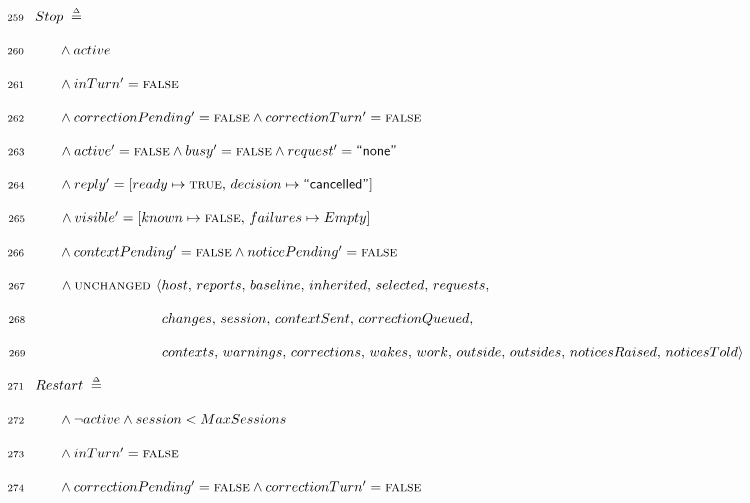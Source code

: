 \documentclass{article}
\makeatletter
\newcommand{\defeq}{\;\mathrel{\smash   %
    {{\stackrel{\scriptscriptstyle\Delta}{=}}}}\;}
\newcommand{\FALSE}{\textsc{false}}
\newcommand{\TRUE}{\textsc{true}}
\newcommand{\UNCHANGED}{\textsc{unchanged }}
\renewcommand{\_}{\rule{.4em}{.06em}\hspace{.05em}}
\newif\ifpcalshading \pcalshadingfalse
\newlength{\pcalvspace}\setlength{\pcalvspace}{0pt}%
\newcommand{\@pvspace}[1]{%
  \ifpcalshading
     \par\global\setlength{\pcalvspace}{#1}%
  \else
     \par\vspace{#1}%
  \fi
}
\renewcommand{\.}[1]{\ensuremath{\mbox{}#1\mbox{}}}
\newcommand{\@s}[1]{\hspace{#1pt}}
\newlength{\@xlen}
\newcommand\xtstrut%
  {\setlength{\@xlen}{1.05em}%
   \addtolength{\@xlen}{\pcalvspace}%
    \raisebox{\vshadelen}{\raisebox{-.25em}{\rule{0pt}{\@xlen}}}%
   \global\setlength{\vshadelen}{0pt}%
   \global\setlength{\pcalvspace}{0pt}}
\newcommand{\@x}[1]{\par
  \ifpcalshading
  \makebox[0pt][l]{\shadebox{\xtstrut\hspace*{\textwidth}}}%
  \fi
  \mbox{$\mbox{}#1\mbox{}$}}
\newcommand{\@w}[1]{\textsf{``{#1}''}}
\def\graymargin{1}
\newlength{\templena}
\newlength{\templenb}
\newcommand{\shadebox}[1]{{\setlength{\fboxsep}{\graymargin pt}%
     \savebox{\tempboxa}{#1}%
     \settoheight{\templena}{\usebox{\tempboxa}}%
     \settodepth{\templenb}{\usebox{\tempboxa}}%
     \hspace*{-\fboxsep}\raisebox{0pt}[\templena][\templenb]%
        {\colorbox{boxshade}{\usebox{\tempboxa}}}\hspace*{-\fboxsep}}}
\newlength{\vshadelen}
\makeatother
\begin{document}
\@x{\makebox[0pt][r]{\scriptsize 259\hspace{1em}} Stop \.{\defeq}}%
\@x{\makebox[0pt][r]{\scriptsize 260\hspace{1em}}\@s{16.4} \.{\land} active}%
 \@x{\makebox[0pt][r]{\scriptsize 261\hspace{1em}}\@s{16.4} \.{\land} inTurn
 \.{'} \.{=} {\FALSE}}%
 \@x{\makebox[0pt][r]{\scriptsize 262\hspace{1em}}\@s{16.4} \.{\land}
 correctionPending \.{'} \.{=} {\FALSE} \.{\land} correctionTurn \.{'} \.{=}
 {\FALSE}}%
 \@x{\makebox[0pt][r]{\scriptsize 263\hspace{1em}}\@s{16.4} \.{\land} active
 \.{'} \.{=} {\FALSE} \.{\land} busy \.{'} \.{=} {\FALSE} \.{\land} request
 \.{'} \.{=}\@w{none}}%
 \@x{\makebox[0pt][r]{\scriptsize 264\hspace{1em}}\@s{16.4} \.{\land} reply
 \.{'} \.{=} [ ready \.{\mapsto} {\TRUE} ,\, decision
 \.{\mapsto}\@w{cancelled} ]}%
 \@x{\makebox[0pt][r]{\scriptsize 265\hspace{1em}}\@s{16.4} \.{\land} visible
 \.{'} \.{=} [ known \.{\mapsto} {\FALSE} ,\, failures \.{\mapsto} Empty ]}%
 \@x{\makebox[0pt][r]{\scriptsize 266\hspace{1em}}\@s{16.4} \.{\land}
 contextPending \.{'} \.{=} {\FALSE} \.{\land} noticePending \.{'} \.{=}
 {\FALSE}}%
 \@x{\makebox[0pt][r]{\scriptsize 267\hspace{1em}}\@s{16.4} \.{\land}
 {\UNCHANGED} {\langle} host ,\, reports ,\, baseline ,\, inherited ,\,
 selected ,\, requests ,\,}%
 \@x{\makebox[0pt][r]{\scriptsize 268\hspace{1em}}\@s{89.98} changes ,\,
 session ,\, contextSent ,\, correctionQueued ,\,}%
 \@x{\makebox[0pt][r]{\scriptsize 269\hspace{1em}}\@s{89.98} contexts ,\,
 warnings ,\, corrections ,\, wakes ,\, work ,\, outside ,\, outsides ,\,
 noticesRaised ,\, noticesTold {\rangle}}%
\@pvspace{8.0pt}%
\@x{\makebox[0pt][r]{\scriptsize 271\hspace{1em}} Restart \.{\defeq}}%
 \@x{\makebox[0pt][r]{\scriptsize 272\hspace{1em}}\@s{16.4} \.{\land} {\lnot}
 active \.{\land} session \.{<} MaxSessions}%
 \@x{\makebox[0pt][r]{\scriptsize 273\hspace{1em}}\@s{16.4} \.{\land} inTurn
 \.{'} \.{=} {\FALSE}}%
 \@x{\makebox[0pt][r]{\scriptsize 274\hspace{1em}}\@s{16.4} \.{\land}
 correctionPending \.{'} \.{=} {\FALSE} \.{\land} correctionTurn \.{'} \.{=}
 {\FALSE}}%
\end{document}
